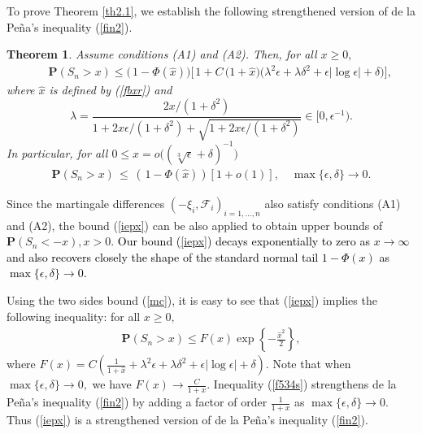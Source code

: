 \documentclass{gSTA2e}
\theoremstyle{plain}
\newtheorem{theorem}{Theorem}[section]
\theoremstyle{definition}
\theoremstyle{remark}
\begin{document}
To prove Theorem \ref{th2.1}, we establish the following strengthened version of de la Pe\~{n}a's  inequality (\ref{fin2}).


\begin{theorem}\label{th2.2}
Assume conditions (A1) and (A2). Then,
for all $  x\geq 0 ,$
\begin{eqnarray}\label{iepx}
&&  \mathbf{P}(S_n>x )   \leq  \Big( \frac{}{}1- \Phi\left( \widehat{x} \right)\Big) \Big[\frac{}{} 1+ C \,\Big(1+\widehat{x} \Big)  \Big( \lambda ^2 \epsilon +  \lambda  \delta^2 + \epsilon \left| \log  \epsilon
 \right| +   \delta \Big )  \Big],
\end{eqnarray}
where $\widehat{x}$ is defined by (\ref{fbxr})
and
\begin{equation}\label{lambda}
 \lambda  = \frac{2x/(1+ \delta^2)}{ 1+2x\epsilon/(1+ \delta^2)+\sqrt{1+2x\epsilon/(1+ \delta^2)} } \in [0,   \epsilon^{-1}).
\end{equation}
In particular, for all $0 \leq x =o\Big(( \sqrt[3]{\epsilon}   + \delta )^{-1}  \Big)$
\begin{eqnarray}\label{f534s}
  \mathbf{P}(S_n>x ) \,\leq\,  \left(\frac{}{} 1- \Phi\left(\widehat{x}\right)\right) \left[1+ o(1) \right],
  \quad \max\{\epsilon, \delta\}\rightarrow 0.
\end{eqnarray}
\end{theorem}

Since the martingale differences $(-\xi _i,\mathcal{F}_i)_{i=1,...,n}$ also satisfy conditions (A1) and (A2), the bound  (\ref{iepx})   can be also applied to obtain upper bounds of $\mathbf{P}(S_n< - x), x>0.$
\textcolor{black}{Our bound  (\ref{iepx}) decays exponentially to zero as $x\rightarrow \infty$ and also recovers closely the shape of the standard normal tail $1-\Phi(x)$ as $\max\{\epsilon, \delta\}\rightarrow 0$.}


 Using the two sides bound (\ref{mc}), it is easy to see that (\ref{iepx}) implies the following inequality: for all $ x \geq 0 ,$
\begin{eqnarray}
  \mathbf{P}(S_n>x )  \leq   F(x)  \exp\left\{ - \frac{ \widehat{x}^2 }{2} \right\} \label{f9},
\end{eqnarray}
where $F(x)=C \left(\frac{1}{1+ \widehat{x}} +  \lambda ^2 \epsilon +  \lambda  \delta^2 + \epsilon \left| \log  \epsilon
 \right| +   \delta   \right)\!.$
Note that when $\max\{\epsilon, \delta\}\rightarrow 0,$  we have $ F(x) \rightarrow \frac{C}{1+x}.$ Inequality (\ref{f534s}) strengthens de la Pe\~{n}a's inequality (\ref{fin2}) by adding a factor of order $\frac{1}{1+ x}$ as $\max\{\epsilon, \delta\}\rightarrow 0$. Thus (\ref{iepx}) is a strengthened version of  de la Pe\~{n}a's inequality (\ref{fin2}).
\end{document}
